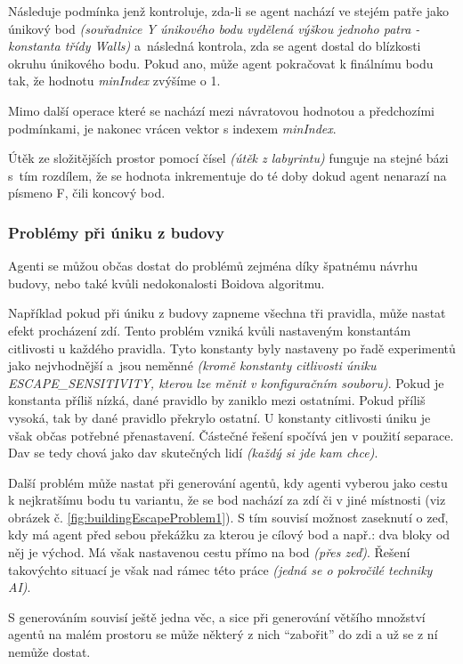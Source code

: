 \documentclass[czech,public,dept460,male,cpdeclaration]{diploma}
\begin{document}
Následuje podmínka jenž kontroluje, zda-li se agent nachází ve stejém patře jako únikový bod \textit{(souřadnice Y únikového bodu vydělená výškou jednoho patra - konstanta třídy Walls)} a~následná kontrola, zda se agent dostal do blízkosti okruhu únikového bodu. Pokud ano, může agent pokračovat k finálnímu bodu tak, že hodnotu \textit{minIndex} zvýšíme o 1.

Mimo další operace které se nachází mezi návratovou hodnotou a předchozími podmínkami, je nakonec vrácen vektor s indexem \textit{minIndex}.

Útěk ze složitějších prostor pomocí čísel \textit{(útěk z labyrintu)} funguje na stejné bázi s~tím rozdílem, že se hodnota inkrementuje do té doby dokud agent nenarazí na písmeno F, čili koncový bod.

\subsubsection{Problémy při úniku z budovy}\label{sec:problemy-pri-uniku-z-budovy}

Agenti se můžou občas dostat do problémů zejména díky špatnému návrhu budovy, nebo také kvůli nedokonalosti Boidova algoritmu. 

Například pokud při úniku z budovy zapneme všechna tři pravidla, může nastat efekt procházení zdí. Tento problém vzniká kvůli nastaveným konstantám citlivosti u každého pravidla. Tyto konstanty byly nastaveny po řadě experimentů jako nejvhodnější a~jsou neměnné \textit{(kromě konstanty citlivosti úniku ESCAPE\_SENSITIVITY, kterou lze měnit v konfiguračním souboru)}. Pokud je konstanta příliš nízká, dané pravidlo by zaniklo mezi ostatními. Pokud příliš vysoká, tak by dané pravidlo překrylo ostatní. U konstanty citlivosti úniku je však občas potřebné přenastavení. Částečné řešení spočívá jen v použití separace. Dav se tedy chová jako dav skutečných lidí \textit{(každý si jde kam chce)}.

Další problém může nastat při generování agentů, kdy agenti vyberou jako cestu \\k nejkratšímu bodu tu variantu, že se bod nachází za zdí či v jiné místnosti (viz obrázek č. \ref{fig:buildingEscapeProblem1}). S tím souvisí možnost zaseknutí o zeď, kdy má agent před sebou překážku za kterou je cílový bod a např.: dva bloky od něj je východ. Má však nastavenou cestu přímo na bod \textit{(přes zeď)}. Řešení takovýchto situací je však nad rámec této práce \textit{(jedná se o pokročilé techniky AI)}.

S generováním souvisí ještě jedna věc, a sice při generování většího množství agentů na malém prostoru se může některý z nich ``zabořit'' do zdi a už se z ní nemůže dostat. 
\end{document}
